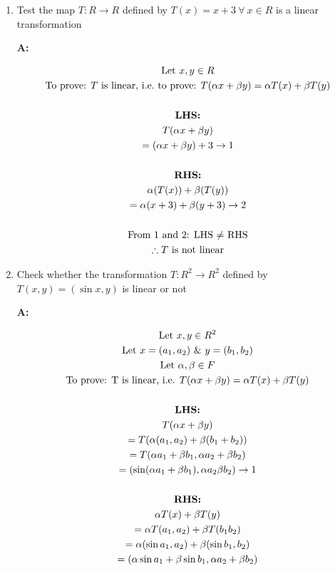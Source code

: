 \documentclass[english,course,fleqn]{lecture}
\newenvironment{qanda}{\begin{enumerate}\setlength{\parindent}{0pt}}{\medskip\end{enumerate}}
\newcommand{\Q}{\bigskip\bfseries \item}
\newcommand{\A}{\par\textbf{A:} \normalfont}
\begin{document}
\begin{qanda}
	\Q Test the map $T:R\rightarrow R$ defined by $T(x) = x + 3 ~\forall~ x \in R$ is a linear transformation

	\A

	\begin{gather*}
		\text{Let }x,y \in R\\
		\text{To prove: $T$ is linear, i.e.\ to prove: $T(\alpha x + \beta y) = \alpha T(x) + \beta T(y)$}\\
		\\
		\text{\textbf{LHS:}}\\
		T(\alpha x + \beta y )\\
		= (\alpha x + \beta y) + 3 \rightarrow 1\\
		\\
		\text{\textbf{RHS:}}\\
		\alpha (T(x)) + \beta (T(y))\\
		= \alpha (x + 3) + \beta ( y + 3) \rightarrow 2\\
		\\
		\text{From $1$ and $2$: LHS $\ne$ RHS}\\
		\therefore \text{$T$ is not linear}
	\end{gather*}

	\Q Check whether the transformation $T:R^{2} \rightarrow R^{2}$ defined by $T(x,y) = (\sin x, y)$ is linear or not

	\A

	\begin{gather*}
		\text{Let $x,y \in R^{2}$}\\
		\text{Let $x = (a_{1}, a_{2})$ \& $y = (b_{1}, b_{2})$}\\
		\text{Let $\alpha, \beta \in F$}\\
		\text{To prove: T is linear, i.e. $T(\alpha x + \beta y) = \alpha T(x) + \beta T(y)$}\\
		\\
		\text{\textbf{LHS:}}\\
		T(\alpha x + \beta y)\\
		= T(\alpha (a_{1}, a_{2}) + \beta(b_{1} + b_{2}))\\
		= T(\alpha a_{1} + \beta b_{1}, \alpha a_{2} + \beta b_{2})\\
		= (\sin (\alpha a_{1} + \beta b_{1}), \alpha a_{2} \beta b_{2}) \rightarrow 1\\
		\\
		\text{\textbf{RHS:}}\\
		\alpha T(x) + \beta T(y)\\
		= \alpha T(a_{1}, a_{2}) + \beta T(b_{1} b_{2})\\
		= \alpha (\sin a_{1}, a_{2}) + \beta (\sin b_{1}, b_{2})\\
		= (\alpha \sin a_{1} + \beta \sin b_{1}, \alpha a_{2} + \beta b_{2})\\
	\end{gather*}


\end{qanda}
\end{document}
